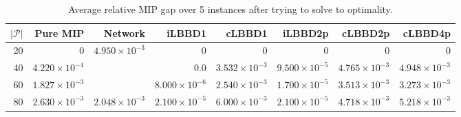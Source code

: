\begin{table*}
    \centering
    \caption{Average relative MIP gap over 5 instances after trying to solve to optimality.}
    \begin{tabular}{rrrrrrrr} \toprule
        $|\mathcal{P}|$ & Pure MIP & Network & iLBBD1 & cLBBD1 & iLBBD2p & cLBBD2p & cLBBD4p \\ \midrule
        20              & 0 &    $4.950 \times 10^{-3}$     & 0 &  0 & 0 & 0 & 0 \\
        40              & $4.220 \times 10^{-4}$ &   & 0.0 & $3.532 \times 10^{-3}$ & $9.500 \times 10^{-5}$ & $4.765 \times 10^{-3}$ & $4.948 \times 10^{-3}$ \\
        60 & $1.827 \times 10^{-3}$ &  & $8.000 \times 10^{-6}$ & $2.540 \times 10^{-3}$ & $1.700 \times 10^{-5}$ & $3.513 \times 10^{-3}$ & $3.273 \times 10^{-3}$ \\
        80 &  $2.630 \times 10^{-3}$ &  $2.048 \times 10^{-3}$ & $2.100 \times 10^{-5}$ &  $6.000 \times 10^{-3}$ & $2.100 \times 10^{-5}$ & $4.718 \times 10^{-3}$ & $5.218 \times 10^{-3}$ \\
        \bottomrule
    \end{tabular}
\end{table*}
